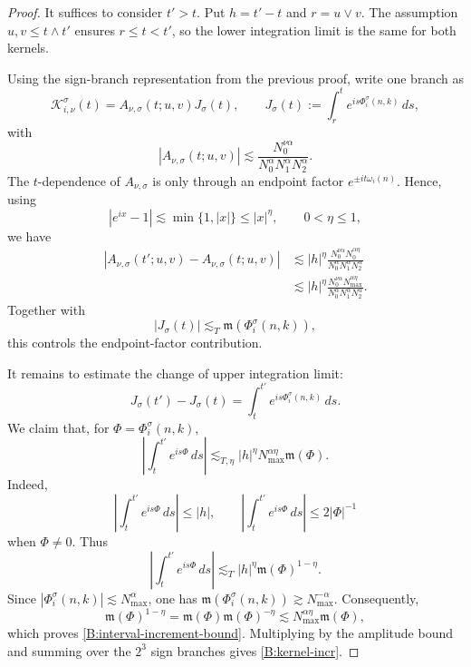 \documentclass[10pt]{amsart}
\numberwithin{equation}{section}
\theoremstyle{plain}
\theoremstyle{definition}
\theoremstyle{remark}
\newcommand{\calK}{\mathcal{K}}
\newcommand{\frakm}{\mathfrak{m}}
\begin{document}
\begin{proof}
It suffices to consider \(t'>t\).  Put \(h=t'-t\) and \(r=u\vee v\).  The assumption \(u,v\le t\wedge t'\) ensures \(r\le t<t'\), so the lower integration limit is the same for both kernels.

Using the sign-branch representation from the previous proof, write one branch as
\[
        \calK_{i,\nu}^{\sigma}(t)
        =A_{\nu,\sigma}(t;u,v)J_\sigma(t),
        \qquad
        J_\sigma(t):=\int_r^t e^{is\Phi_i^\sigma(n,k)}\,ds,
\]
with
\[
        |A_{\nu,\sigma}(t;u,v)|
        \lesssim
        \frac{N_0^{\nu\alpha}}{N_0^\alpha N_1^\alpha N_2^\alpha}.
\]
The \(t\)-dependence of \(A_{\nu,\sigma}\) is only through an endpoint factor \(e^{\pm it\omega_i(n)}\).  Hence, using
\[
        |e^{ix}-1|\lesssim\min\{1,|x|\}\le |x|^\eta,
        \qquad 0<\eta\le1,
\]
we have
\[
\begin{aligned}
        |A_{\nu,\sigma}(t';u,v)-A_{\nu,\sigma}(t;u,v)|
        &\lesssim
        |h|^\eta
        \frac{N_0^{\nu\alpha}N_0^{\alpha\eta}}
             {N_0^\alpha N_1^\alpha N_2^\alpha} \\
        &\lesssim
        |h|^\eta
        \frac{N_0^{\nu\alpha}N_{\max}^{\alpha\eta}}
             {N_0^\alpha N_1^\alpha N_2^\alpha}.
\end{aligned}
\]
Together with
\[
        |J_\sigma(t)|\lesssim_T\frakm(\Phi_i^\sigma(n,k)),
\]
this controls the endpoint-factor contribution.

It remains to estimate the change of upper integration limit:
\[
        J_\sigma(t')-J_\sigma(t)
        =
        \int_t^{t'} e^{is\Phi_i^\sigma(n,k)}\,ds.
\]
We claim that, for \(\Phi=\Phi_i^\sigma(n,k)\),
\begin{equation}\label{B:interval-increment-bound}
        \left|\int_t^{t'}e^{is\Phi}\,ds\right|
        \lesssim_{T,\eta}
        |h|^\eta N_{\max}^{\alpha\eta}\frakm(\Phi).
\end{equation}
Indeed,
\[
        \left|\int_t^{t'}e^{is\Phi}\,ds\right|\le |h|,
        \qquad
        \left|\int_t^{t'}e^{is\Phi}\,ds\right|\le 2|\Phi|^{-1}
\]
when \(\Phi\ne0\).  Thus
\[
        \left|\int_t^{t'}e^{is\Phi}\,ds\right|
        \lesssim_T |h|^\eta \frakm(\Phi)^{1-\eta}.
\]
Since \(|\Phi_i^\sigma(n,k)|\lesssim N_{\max}^\alpha\), one has \(\frakm(\Phi_i^\sigma(n,k))\gtrsim N_{\max}^{-\alpha}\).  Consequently,
\[
        \frakm(\Phi)^{1-\eta}
        =
        \frakm(\Phi)\frakm(\Phi)^{-\eta}
        \lesssim
        N_{\max}^{\alpha\eta}\frakm(\Phi),
\]
which proves \eqref{B:interval-increment-bound}.  Multiplying by the amplitude bound and summing over the \(2^3\) sign branches gives \eqref{B:kernel-incr}.
\end{proof}
\end{document}
